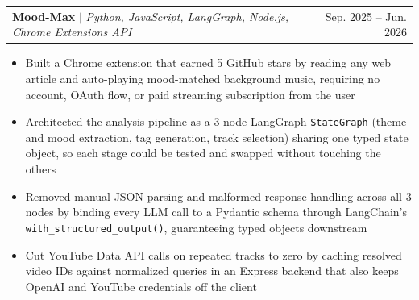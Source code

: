 \documentclass[letterpaper,11pt]{article}
\makeatletter
\newcommand{\resumeItem}[1]{
  \item\small{
    {#1 \vspace{-2pt}}
  }
}
\newcommand{\resumeProjectHeading}[2]{
    \item
    \begin{tabular*}{0.97\textwidth}{l@{\extracolsep{\fill}}r}
      \small#1 & #2 \\
    \end{tabular*}\vspace{-7pt}
}
\newcommand{\resumeItemListStart}{\begin{itemize}}
\newcommand{\resumeItemListEnd}{\end{itemize}\vspace{-7pt}}
\makeatother
\begin{document}
      \resumeProjectHeading
          {\textbf{Mood-Max} $|$ \emph{Python, JavaScript, LangGraph, Node.js, Chrome Extensions API}}{Sep. 2025 -- Jun. 2026}
          \resumeItemListStart
            \resumeItem{Built a Chrome extension that earned 5 GitHub stars by reading any web article and auto-playing mood-matched background music, requiring no account, OAuth flow, or paid streaming subscription from the user}
            \resumeItem{Architected the analysis pipeline as a 3-node LangGraph \texttt{StateGraph} (theme and mood extraction, tag generation, track selection) sharing one typed state object, so each stage could be tested and swapped without touching the others}
            \resumeItem{Removed manual JSON parsing and malformed-response handling across all 3 nodes by binding every LLM call to a Pydantic schema through LangChain's \texttt{with\_structured\_output()}, guaranteeing typed objects downstream}
            \resumeItem{Cut YouTube Data API calls on repeated tracks to zero by caching resolved video IDs against normalized queries in an Express backend that also keeps OpenAI and YouTube credentials off the client}
          \resumeItemListEnd
\end{document}
